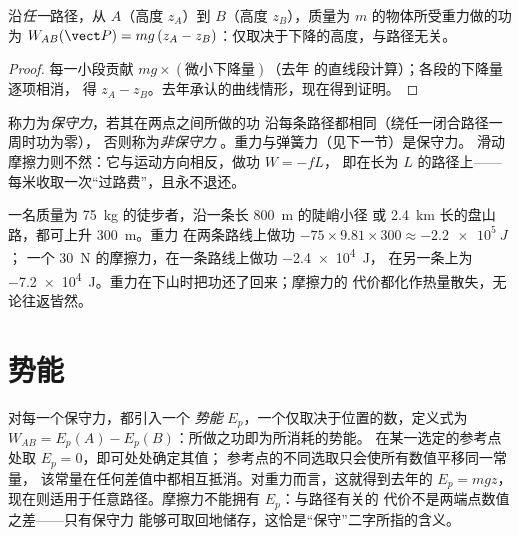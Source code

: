 \begin{proposition}\label{prop:g12:work-and-energy:weight}
沿\emph{任一}路径，从 $A$（高度 $z_A$）到 $B$（高度
$z_B$），质量为 $m$ 的物体所受重力做的功为
$W_{AB}(\vect P) = mg\,(z_A - z_B)$：仅取决于下降的高度，与路径无关。
\end{proposition}

\begin{proof}
每一小段贡献 $mg \times (\text{微小下降量})$（去年
的直线段计算）；各段的下降量逐项相消，
得 $z_A - z_B$。去年承认的曲线情形，现在得到证明。
\end{proof}

\begin{definition}[保守力与非保守力]\label{def:g12:work-and-energy:conservative}
称力为\emph{保守力}，若其在两点之间所做的功
沿每条路径都相同（绕任一闭合路径一周时功为零），
否则称为\emph{非保守力}
。重力与弹簧力（见下一节）是保守力。
滑动摩擦力则不然：它与运动方向相反，做功 $W = -fL$，
即在长为 $L$ 的路径上——每米收取一次“过路费”，且永不退还。
\end{definition}

\begin{example}[通往小屋的两条路线]\label{ex:g12:work-and-energy:trails}
一名质量为 \qty{75}{kg} 的徒步者，沿一条长 \qty{800}{m} 的陡峭小径
或 \qty{2.4}{km} 长的盘山路，都可上升 \qty{300}{m}。重力
在两条路线上做功 $-75 \times 9.81 \times 300 \approx \qty{-2.2e5}{J}$；
一个 \qty{30}{N} 的摩擦力，在一条路线上做功 \qty{-2.4e4}{J}，
在另一条上为 \qty{-7.2e4}{J}。重力在下山时把功还了回来；摩擦力的
代价都化作热量散失，无论往返皆然。
\end{example}

\section{势能}

\begin{definition}[势能]\label{def:g12:work-and-energy:ep}
对每一个保守力，都引入一个
\emph{势能}
$E_p$，一个仅取决于位置的数，定义式为
$W_{AB} = E_p(A) - E_p(B)$：所做之功即为所消耗的势能。
在某一选定的参考点处取 $E_p = 0$，即可处处确定其值；
参考点的不同选取只会使所有数值平移同一常量，
该常量在任何差值中都相互抵消。对重力而言，这就得到去年的 $E_p = mgz$，
现在则适用于任意路径。摩擦力不能拥有 $E_p$：与路径有关的
代价不是两端点数值之差——只有保守力
能够可取回地储存，这恰是“保守”二字所指的含义。
\end{definition}

